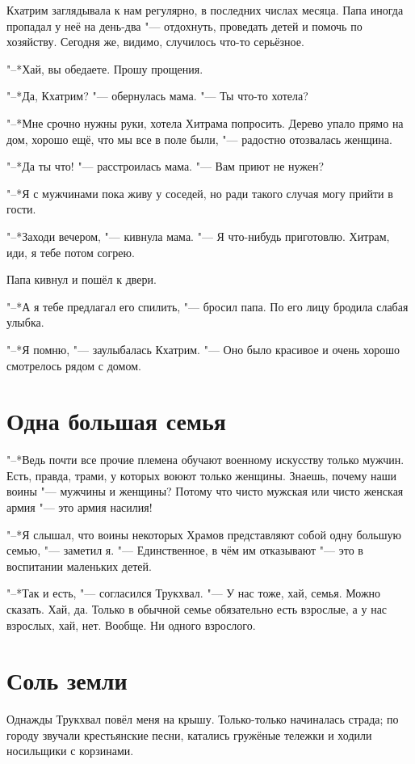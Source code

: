 \documentclass[a4paper,10pt]{book}
\begin{document}
Кхатрим заглядывала к нам регулярно, в последних числах месяца. Папа иногда 
пропадал у неё на день-два "--- отдохнуть, проведать детей и помочь по 
хозяйству. Сегодня же, видимо, случилось что-то серьёзное.

"--*Хай, вы обедаете. Прошу прощения.

"--*Да, Кхатрим? "--- обернулась мама. "--- Ты что-то хотела?

"--*Мне срочно нужны руки, хотела Хитрама попросить. Дерево упало прямо на дом, 
хорошо ещё, что мы все в поле были, "--- радостно отозвалась женщина.

"--*Да ты что! "--- расстроилась мама. "--- Вам приют не нужен?

"--*Я с мужчинами пока живу у соседей, но ради такого случая могу прийти в 
гости.

"--*Заходи вечером, "--- кивнула мама. "--- Я что-нибудь приготовлю. Хитрам, 
иди, я тебе потом согрею.

Папа кивнул и пошёл к двери.

"--*А я тебе предлагал его спилить, "--- бросил папа. По его лицу бродила 
слабая улыбка.

"--*Я помню, "--- заулыбалась Кхатрим. "--- Оно было красивое и очень хорошо 
смотрелось рядом с домом.
 
\section{Одна большая семья}

"--*Ведь почти все прочие племена обучают военному искусству только мужчин. 
Есть, правда, трами, у которых воюют только женщины. Знаешь, почему наши воины 
"--- мужчины и женщины? Потому что чисто мужская или чисто женская армия "--- 
это армия насилия!

"--*Я слышал, что воины некоторых Храмов представляют собой одну большую семью, 
"--- заметил я. "--- Единственное, в чём им отказывают "--- это в воспитании 
маленьких детей.

"--*Так и есть, "--- согласился Трукхвал. "--- У нас тоже, хай, семья. 
Можно сказать. Хай, да. Только в обычной семье обязательно есть взрослые, а у 
нас взрослых, хай, нет. Вообще. Ни одного взрослого.

\section{Соль земли}

Однажды Трукхвал повёл меня на крышу. Только-только начиналась страда; по 
городу 
звучали крестьянские песни, катались гружёные тележки и ходили носильщики с 
корзинами.
\end{document}
